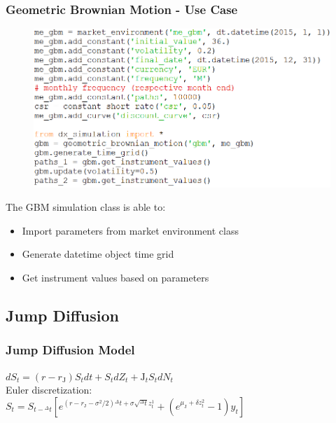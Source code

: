 \documentclass{beamer}
\begin{document}
\begin{frame}
\frametitle{Geometric Brownian Motion - Use Case}
\begin{figure}[H]
	\includegraphics[scale=0.45]{gbm_use_case.png}
\end{figure}
The GBM simulation class is able to:
\begin{itemize}
	\item Import parameters from market environment class
	\item Generate datetime object time grid
	\item Get instrument values based on parameters
\end{itemize}
\end{frame}

\subsection{Jump Diffusion}
\begin{frame}
\frametitle{Jump Diffusion Model}
\begin{center}
$dS_{t} = (r-r_{\mathrm{J}})S_{t}dt + S_{t}dZ_{t}	+ {\mathrm{J}}_{t}S_{t}dN_{t}$\\[10mm]
	Euler discretization:\\[6mm]
	$S_{t} = S_{t-{^{\Delta}t}} [e^{(r-r_{\mathrm{J}}-\sigma^{2}/2){^{\Delta}t}+\sigma \sqrt{^{\Delta}t}z_{t}^{1}}+(e^{\mu_{\mathrm{J}}+\delta z_{t}^{2}}-1)y_{t}] $
\end{center}
\end{frame}
\end{document}
